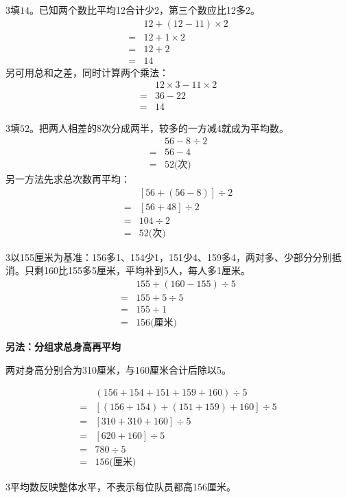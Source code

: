 \documentclass[multi=snippet,border={5bp 20bp 5bp 5bp}]{standalone}
\newenvironment{snippet}[3]{\begin{minipage}{#1bp}\color{answerred}\fontsize{#2}{#3}\selectfont\raggedright}{\end{minipage}}
\begin{document}
\begin{snippet}{505}{11.5}{14}\begin{multicols}{3}\raggedcolumns 填\(14\)\allowbreak 。已知两个数比平均12合计少2，第三个数应比12多2。\[\begin{aligned}&12+(12-11)\times2\\={}&12+1\times2\\={}&12+2\\={}&14\end{aligned}\]另可用总和之差，同时计算两个乘法：\[\begin{aligned}&12\times3-11\times2\\={}&36-22\\={}&14\end{aligned}\]\end{multicols}\end{snippet}
\begin{snippet}{505}{11.5}{14}\begin{multicols}{3}\raggedcolumns 填\(52\)\allowbreak 。把两人相差的8次分成两半，较多的一方减4就成为平均数。\[\begin{aligned}&56-8\div2\\={}&56-4\\={}&52\text{(次)}\end{aligned}\]另一方法先求总次数再平均：\[\begin{aligned}&[56+(56-8)]\div2\\={}&[56+48]\div2\\={}&104\div2\\={}&52\text{(次)}\end{aligned}\]\end{multicols}\end{snippet}
\begin{snippet}{505}{11.5}{14}\begin{multicols}{3}\raggedcolumns 以155厘米为基准：156多1、154少1，151少4、159多4，两对多、少部分分别抵消。只剩160比155多5厘米，平均补到5人，每人多1厘米。\[\begin{aligned}&155+(160-155)\div5\\={}&155+5\div5\\={}&155+1\\={}&156\text{(厘米)}\end{aligned}\]\par\textbf{另法：分组求总身高再平均}\par 两对身高分别合为310厘米，与160厘米合计后除以5。\end{multicols}\[\begin{aligned}&(156+154+151+159+160)\div5\\={}&[(156+154)+(151+159)+160]\div5\\={}&[310+310+160]\div5\\={}&[620+160]\div5\\={}&780\div5\\={}&156\text{(厘米)}\end{aligned}\]\begin{multicols}{3}\raggedcolumns 平均数反映整体水平，不表示每位队员都高156厘米。\end{multicols}\end{snippet}
\end{document}
